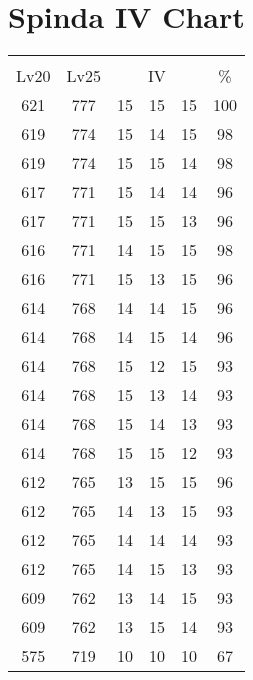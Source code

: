 \documentclass{article}%
\begin{document}
%
\normalsize%
\section{Spinda IV Chart}%
\label{sec:Spinda IV Chart}%
\renewcommand{\arraystretch}{1.5}%
\begin{tabular}{|c|c|c|c|c|c|}%
\hline%
\multicolumn{6}{|c|}{\textcolor{white}{ 
\linebreak{Spinda}
}%
\cellcolor{black}}\\%
\multicolumn{1}{|c}{Lv20}&\multicolumn{1}{c|}{Lv25}&\multicolumn{3}{c|}{IV}&\multicolumn{1}{|c|}{\%}\\%
\hline%
\rowcolor{color100}%
621&777&15&15&15&100\\%
\hline%
\rowcolor{color98}%
619&774&15&14&15&98\\%
\hline%
\rowcolor{color98}%
619&774&15&15&14&98\\%
\hline%
\rowcolor{color96}%
617&771&15&14&14&96\\%
\hline%
\rowcolor{color96}%
617&771&15&15&13&96\\%
\hline%
\rowcolor{color98}%
616&771&14&15&15&98\\%
\hline%
\rowcolor{color96}%
616&771&15&13&15&96\\%
\hline%
\rowcolor{color96}%
614&768&14&14&15&96\\%
\hline%
\rowcolor{color96}%
614&768&14&15&14&96\\%
\hline%
\rowcolor{color93}%
614&768&15&12&15&93\\%
\hline%
\rowcolor{color93}%
614&768&15&13&14&93\\%
\hline%
\rowcolor{color93}%
614&768&15&14&13&93\\%
\hline%
\rowcolor{color93}%
614&768&15&15&12&93\\%
\hline%
\rowcolor{color96}%
612&765&13&15&15&96\\%
\hline%
\rowcolor{color93}%
612&765&14&13&15&93\\%
\hline%
\rowcolor{color93}%
612&765&14&14&14&93\\%
\hline%
\rowcolor{color93}%
612&765&14&15&13&93\\%
\hline%
\rowcolor{color93}%
609&762&13&14&15&93\\%
\hline%
\rowcolor{color93}%
609&762&13&15&14&93\\%
\hline%
\rowcolor{color91}%
575&719&10&10&10&67\\%
\end{tabular}

%
\end{document}
